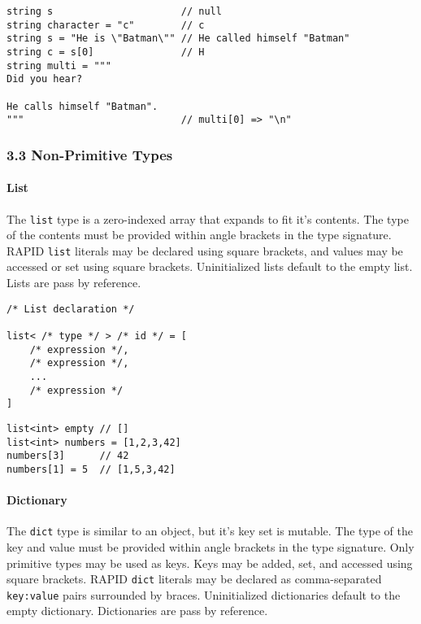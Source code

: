 \documentclass[]{article}
\begin{document}
\begin{verbatim}
string s                      // null
string character = "c"        // c
string s = "He is \"Batman\"" // He called himself "Batman"
string c = s[0]               // H
string multi = """
Did you hear?

He calls himself "Batman".
"""                           // multi[0] => "\n"
\end{verbatim}

\subsubsection{3.3 Non-Primitive Types}\label{non-primitive-types}

\paragraph{List}\label{list}

The \texttt{list} type is a zero-indexed array that expands to fit it's
contents. The type of the contents must be provided within angle
brackets in the type signature. RAPID \texttt{list} literals may be
declared using square brackets, and values may be accessed or set using
square brackets. Uninitialized lists default to the empty list. Lists
are pass by reference.

\begin{verbatim}
/* List declaration */

list< /* type */ > /* id */ = [
    /* expression */,
    /* expression */,
    ...
    /* expression */
]
\end{verbatim}

\begin{verbatim}
list<int> empty // []
list<int> numbers = [1,2,3,42]
numbers[3]      // 42
numbers[1] = 5  // [1,5,3,42]
\end{verbatim}

\paragraph{Dictionary}\label{dictionary}

The \texttt{dict} type is similar to an object, but it's key set is
mutable. The type of the key and value must be provided within angle
brackets in the type signature. Only primitive types may be used as
keys. Keys may be added, set, and accessed using square brackets. RAPID
\texttt{dict} literals may be declared as comma-separated
\texttt{key:value} pairs surrounded by braces. Uninitialized
dictionaries default to the empty dictionary. Dictionaries are pass by
reference.
\end{document}
